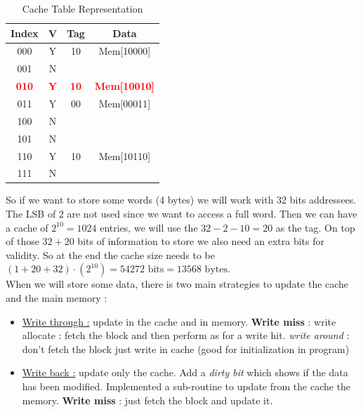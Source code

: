\documentclass{report}
\begin{document}
\begin{table}[h]
    \centering
    \renewcommand{\arraystretch}{1.3}
    \begin{tabular}{|c|c|c|c|}
        \hline
        \textbf{Index} & \textbf{V} & \textbf{Tag} & \textbf{Data} \\
        \hline
        000 & Y & 10 & Mem[10000] \\
        \hline
        001 & N &  &  \\
        \hline
        \textbf{\textcolor{red}{010}} & \textbf{\textcolor{red}{Y}} & \textbf{\textcolor{red}{10}} & \textbf{\textcolor{red}{Mem[10010]}} \\
        \hline
        011 & Y & 00 & Mem[00011] \\
        \hline
        100 & N &  &  \\
        \hline
        101 & N &  &  \\
        \hline
        110 & Y & 10 & Mem[10110] \\
        \hline
        111 & N &  &  \\
        \hline
    \end{tabular}
    \caption{Cache Table Representation}
    \label{tab:cache_table}
\end{table}

So if we want to store some words (4 bytes) we will work with 32 bits addressees. The LSB of 2 are not used since we want to access a full word. Then we can have a cache of $2^{10} = 1024$ entries, we will use the $32-2-10 = 20$ as the tag. On top of those $32+20$ bits of information to store we also need an extra bits for validity. So at the end the cache size needs to be $(1+20+32)\cdot(2^{10}) = 54272 \text{ bits} = 13568 \text{ bytes}$.\\

When we will store some data, there is two main strategies to update the cache and the main memory : 

\begin{itemize}
    \item \underline{Write through :} update in the cache and in memory. \textbf{Write miss} : write allocate : fetch the block and then perform as for a write hit. \textit{write around} : don't fetch the block just write in cache (good for initialization in program)
    \item \underline{Write back :} update only the cache. Add a \textit{dirty bit} which shows if the data has been modified. Implemented a sub-routine to update from the cache the memory. \textbf{Write miss} : just fetch the block and update it.
\end{itemize}
\end{document}
